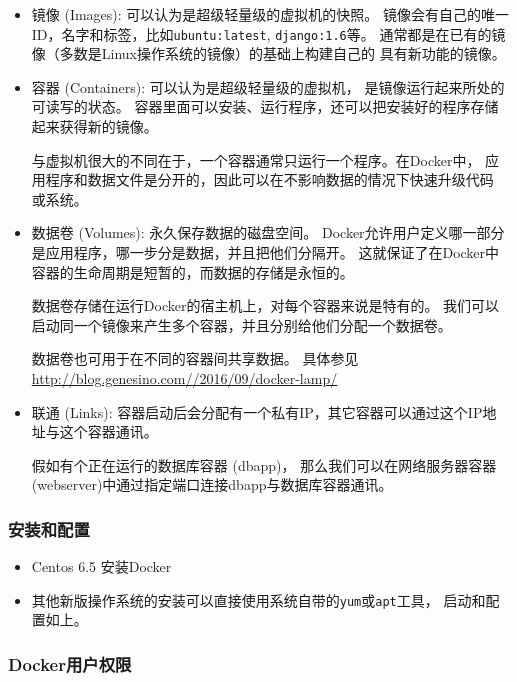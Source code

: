 \documentclass[]{article}
\numberwithin{figure}{section}
\numberwithin{table}{section}
\begin{document}
\begin{itemize}
\item
  镜像 (Images): 可以认为是超级轻量级的虚拟机的快照。
  镜像会有自己的唯一ID，名字和标签，比如\texttt{ubuntu:latest}, \texttt{django:1.6}等。
  通常都是在已有的镜像（多数是Linux操作系统的镜像）的基础上构建自己的
  具有新功能的镜像。
\item
  容器 (Containers): 可以认为是超级轻量级的虚拟机，
  是镜像运行起来所处的可读写的状态。
  容器里面可以安装、运行程序，还可以把安装好的程序存储起来获得新的镜像。

  与虚拟机很大的不同在于，一个容器通常只运行一个程序。在Docker中，
  应用程序和数据文件是分开的，因此可以在不影响数据的情况下快速升级代码
  或系统。
\item
  数据卷 (Volumes): 永久保存数据的磁盘空间。
  Docker允许用户定义哪一部分是应用程序，哪一步分是数据，并且把他们分隔开。
  这就保证了在Docker中容器的生命周期是短暂的，而数据的存储是永恒的。

  数据卷存储在运行Docker的宿主机上，对每个容器来说是特有的。
  我们可以启动同一个镜像来产生多个容器，并且分别给他们分配一个数据卷。

  数据卷也可用于在不同的容器间共享数据。
  具体参见\url{http://blog.genesino.com//2016/09/docker-lamp/}
\item
  联通 (Links): 容器启动后会分配有一个私有IP，其它容器可以通过这个IP地
  址与这个容器通讯。

  假如有个正在运行的数据库容器 (dbapp)，
  那么我们可以在网络服务器容器 (webserver)中通过指定端口连接dbapp与数据库容器通讯。
\end{itemize}

\hypertarget{docker_install}{%
\subsubsection{安装和配置}\label{docker_install}}

\begin{itemize}
\item
  Centos 6.5 安装Docker
\item
  其他新版操作系统的安装可以直接使用系统自带的\texttt{yum}或\texttt{apt}工具，
  启动和配置如上。
\end{itemize}

\hypertarget{docker_priviledges}{%
\subsubsection{Docker用户权限}\label{docker_priviledges}}
\end{document}
